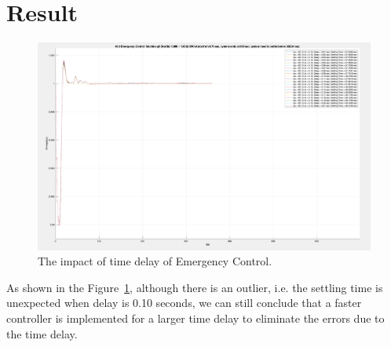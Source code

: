 \section{Result} %
\begin{figure}[htbp]
\centering
\includegraphics[width = .819\textwidth]{figure/6_3.png}
\caption{The impact of time delay of Emergency Control.}
\label{6_3}
\end{figure}

As shown in the Figure~\ref{6_3}, although there is an outlier, i.e. the settling time is unexpected when delay is 0.10 seconds, we can still conclude that a faster controller is implemented for a larger time delay to eliminate the errors due to the time delay.\\